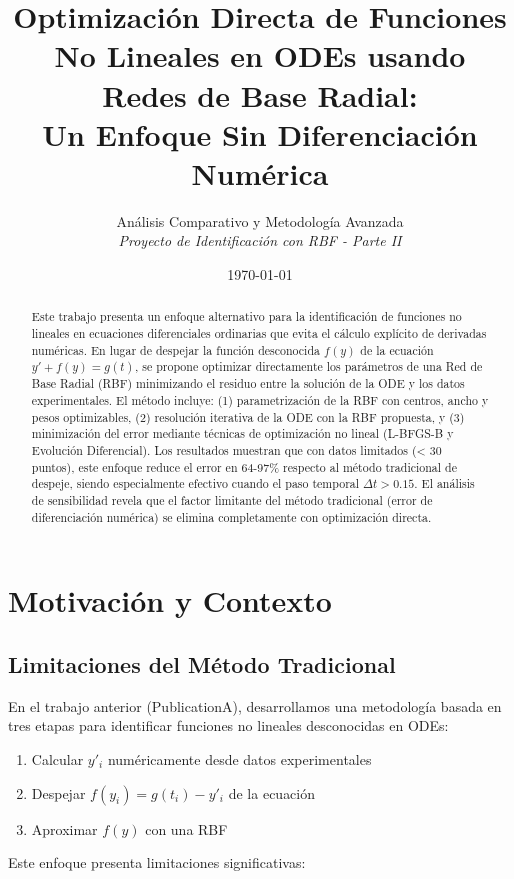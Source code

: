 \documentclass[11pt,a4paper]{article}
\title{\textbf{Optimización Directa de Funciones No Lineales en ODEs usando Redes de Base Radial:\\Un Enfoque Sin Diferenciación Numérica}}
\author{
    Análisis Comparativo y Metodología Avanzada\\
    \textit{Proyecto de Identificación con RBF - Parte II}
}
\date{\today}
\begin{document}
\maketitle

\begin{abstract}
Este trabajo presenta un enfoque alternativo para la identificación de funciones no lineales en ecuaciones diferenciales ordinarias que evita el cálculo explícito de derivadas numéricas. En lugar de despejar la función desconocida $f(y)$ de la ecuación $y' + f(y) = g(t)$, se propone optimizar directamente los parámetros de una Red de Base Radial (RBF) minimizando el residuo entre la solución de la ODE y los datos experimentales. El método incluye: (1) parametrización de la RBF con centros, ancho y pesos optimizables, (2) resolución iterativa de la ODE con la RBF propuesta, y (3) minimización del error mediante técnicas de optimización no lineal (L-BFGS-B y Evolución Diferencial). Los resultados muestran que con datos limitados (< 30 puntos), este enfoque reduce el error en 64-97\% respecto al método tradicional de despeje, siendo especialmente efectivo cuando el paso temporal $\Delta t > 0.15$. El análisis de sensibilidad revela que el factor limitante del método tradicional (error de diferenciación numérica) se elimina completamente con optimización directa.
\end{abstract}

\section{Motivación y Contexto}

\subsection{Limitaciones del Método Tradicional}

En el trabajo anterior (PublicationA), desarrollamos una metodología basada en tres etapas para identificar funciones no lineales desconocidas en ODEs:

\begin{enumerate}
    \item Calcular $y'_i$ numéricamente desde datos experimentales
    \item Despejar $f(y_i) = g(t_i) - y'_i$ de la ecuación
    \item Aproximar $f(y)$ con una RBF
\end{enumerate}

Este enfoque presenta limitaciones significativas:
\end{document}
